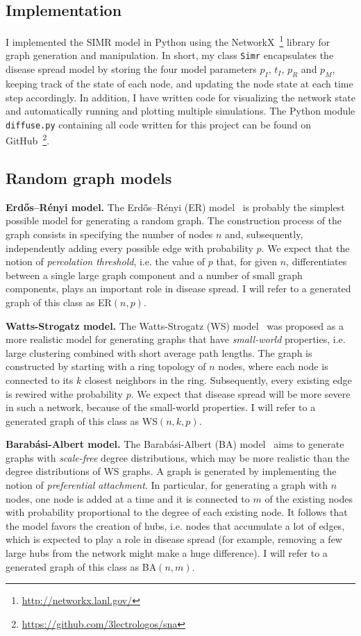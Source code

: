 \documentclass[11pt]{article} %
\begin{document}
\subsection{Implementation}
I implemented the SIMR model in Python using
the NetworkX~\footnote{\url{http://networkx.lanl.gov/}} library for graph
generation and manipulation. In short, my class \texttt{Simr} encapsulates the
disease spread model by storing the four model parameters $p_I$, $t_I$, $p_R$
and $p_M$, keeping track of the state of each node, and updating the node state
at each time step accordingly. In addition, I have
written code for visualizing the network state and automatically running
and plotting multiple simulations. The Python module \texttt{diffuse.py}
containing all code written for this project can be found on
GitHub~\footnote{\url{https://github.com/3lectrologos/sna}}.

\subsection{Random graph models}
\noindent\textbf{Erdős–Rényi model.} The Erdős–Rényi (ER) model~\cite{erdos} is
probably the simplest possible model for generating a random graph. The
construction process of the graph consists in specifying the number of
nodes $n$ and, subsequently, independently adding every possible edge
with probability $p$. We expect that the notion of \emph{percolation
threshold}, i.e. the value of $p$ that, for given $n$, differentiates
between a single large graph component and a number of small graph
components, plays an important role in disease spread. I will refer to a
generated graph of this class as ER$(n, p)$.

\noindent\textbf{Watts-Strogatz model.} The Watts-Strogatz (WS)
model~\cite{watts} was proposed as a more realistic model for generating graphs
that have \emph{small-world} properties, i.e. large clustering combined with
short average path lengths. The graph is constructed by starting with a ring
topology of $n$ nodes, where each node is connected to its $k$ closest neighbors
in the ring. Subsequently, every existing edge is rewired withe probability $p$.
We expect that disease spread will be more severe in such a network, because
of the small-world properties. I will refer to a generated graph of this class
as WS$(n, k, p)$.

\noindent\textbf{Barabási-Albert model.} The Barabási-Albert (BA)
model~\cite{barabasi} aims to generate graphs with \emph{scale-free} degree
distributions, which may be more realistic than the degree distributions of
WS graphs. A graph is generated by implementing the notion of
\emph{preferential attachment}. In particular, for generating a graph with
$n$ nodes, one node is added at a time and it is connected to $m$ of the
existing nodes with probability proportional to the degree of each existing
node. It follows that the model favors the creation of hubs, i.e. nodes that
accumulate a lot of edges, which is expected to play a role in disease spread
(for example, removing a few large hubs from the network might make a huge
difference). I will refer to a generated graph of this class
as BA$(n, m)$.
\end{document}
